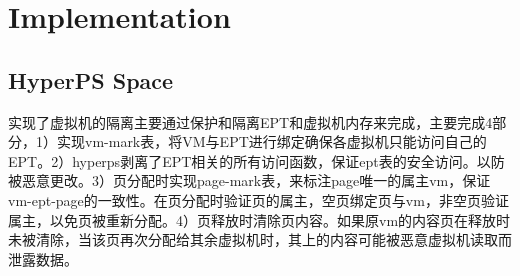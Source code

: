 \section{Implementation}%
\label{sec:implementation}


\subsection{HyperPS Space}%
\label{sub:hyperps_space}
\iffalse 

实现了虚拟机的隔离主要通过保护和隔离EPT和虚拟机内存来完成，主要完成4部分，1）实现vm-mark表，将VM与EPT进行绑定确保各虚拟机只能访问自己的EPT。2）hyperps剥离了EPT相关的所有访问函数，保证ept表的安全访问。以防被恶意更改。3）页分配时实现page-mark表，来标注page唯一的属主vm，保证vm-ept-page的一致性。在页分配时验证页的属主，空页绑定页与vm，非空页验证属主，以免页被重新分配。4）页释放时清除页内容。如果原vm的内容页在释放时未被清除，当该页再次分配给其余虚拟机时，其上的内容可能被恶意虚拟机读取而泄露数据。


